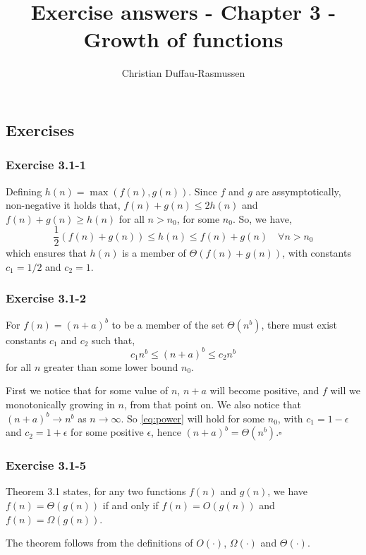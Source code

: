 \documentclass{article}
\title{Exercise answers - Chapter 3 - Growth of functions}
\author{Christian Duffau-Rasmussen}
\begin{document}
\maketitle

\subsection*{Exercises}

\subsubsection*{Exercise 3.1-1}

Defining $h(n) = \max(f(n), g(n))$. Since $f$ and $g$ are assymptotically, non-negative it holds that, $f(n)+ g(n) \leq 2h(n)$ and $f(n) + g(n)\geq h(n)$ for all $n>n_0$, for some $n_0$. So, we have,
\[
\frac{1}{2}(f(n) + g(n)) \leq h(n) \leq f(n) + g(n)\quad\forall n>n_0
\]
which ensures that $h(n)$ is a member of $\Theta(f(n) + g(n))$, with constants $c_1=1/2$ and $c_2=1$. 

\subsubsection*{Exercise 3.1-2}

For $f(n)=(n+a)^b$ to be a member of the set $\Theta(n^b)$, there must exist constants $c_1$ and $c_2$ such that,
\begin{equation} \label{eq:power}
c_1n^b \leq (n+a)^b \leq c_2n^b 
\end{equation} 
for all $n$ greater than some lower bound $n_0$.

First we notice that for some value of $n$, $n+a$ will become positive, and $f$ will we monotonically growing in $n$, from that point on.
We also notice that $(n+a)^b\rightarrow n^b$ as $n\rightarrow\infty$. So \eqref{eq:power} will hold for some $n_0$, with $c_1=1-\epsilon$ and $c_2=1+\epsilon$ for some positive $\epsilon$, hence $(n+a)^b=\Theta(n^b)$.$\square$

\subsubsection*{Exercise 3.1-5}

Theorem 3.1 states, for any two functions $f(n)$ and $g(n)$, we have $f(n)= \Theta(g(n))$ if and only if $f(n) = O(g(n))$ and $f(n) = \Omega(g(n))$.

The theorem follows from the definitions of $O(\cdot)$, $\Omega(\cdot)$ and $\Theta(\cdot)$. 
\end{document}
